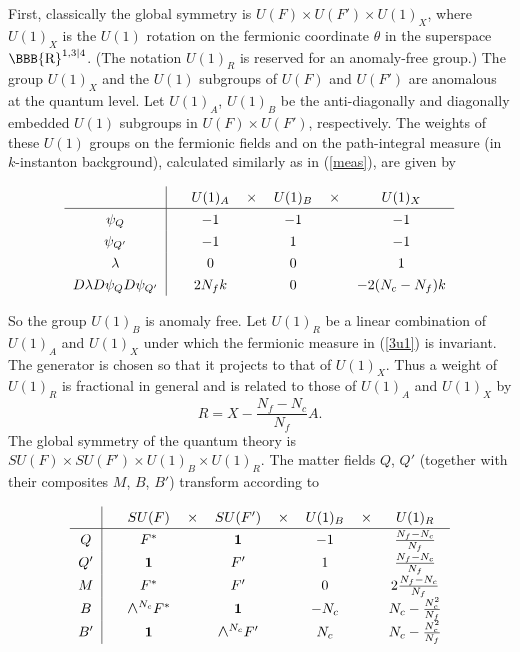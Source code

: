 \documentclass[lecture]{qft-l}
\newcommand{\lam}{\lambda}
\newcommand{\tht}{\theta}
\newcommand{\RE}{{\mbox{\BBB{R}}}}
\newcommand{\medwedge}{\mbox{\fontsize{12pt}{0pt}\selectfont $\wedge$}}
\newcommand{\one}{\mathbf{1}}
\newcommand{\FT}{F'}%
\newcommand{\QT}{Q'}%
\newcommand{\BT}{B'}%
\newcommand{\GLOBAL}{SU(F)\times SU(\FT)\times U(1)_B\times U(1)_R}
\numberwithin{figure}{chapter}
\begin{document}
First, classically the global symmetry is $U(F)\times U(\FT)\times U(1)_X$,
where $U(1)_X$ is the $U(1)$ rotation on the fermionic coordinate $\tht$
in the superspace $\RE^{1,3|4}$.
(The notation $U(1)_R$ is reserved for an anomaly-free group.) 
The group $U(1)_X$ and the $U(1)$ subgroups of $U(F)$ and $U(\FT)$
are anomalous at the quantum level.
Let $U(1)_A$, $U(1)_B$ be the anti-diagonally and diagonally embedded $U(1)$
subgroups in $U(F)\times U(\FT)$, respectively.
The weights of these $U(1)$ groups on the fermionic fields and on the
path-integral measure (in $k$-instanton background),
calculated similarly as in (\ref{meas}), are given by

\bigskip
\begin{equation}
\renewcommand{\arraystretch}{1.3}
\begin{tabular}{c|cccccc}\label{3u1}
	&&    $U(1)_A$	&   $\times$	&   $U(1)_B$	
		&   $\times$	&   $U(1)_X$	\\
			\hline
$\psi_Q$	&&      $-1$	&		&     $-1$	
				&		&    $-1$	\\
$\psi_{\QT}$	&&     $-1$	&		&    $1$	
				&		&    $-1$	\\
$\lam$		&&      $0$	&		&     $0$	
				&		&     $1$	\\
$D\lam D\psi_Q D\psi_{\QT}$ && $2N_fk$ &	&     $0$
&	& $-2(N_c-N_f)k$
        \end{tabular}
\end{equation}

\bigskip\noindent
So the group $U(1)_B$ is anomaly free.
Let $U(1)_R$ be a linear combination of $U(1)_A$ and $U(1)_X$
under which the fermionic measure in (\ref{3u1}) is invariant.
The generator is chosen so that it projects to that of $U(1)_X$.
Thus a weight of $U(1)_R$ is fractional in general and is related to
those of $U(1)_A$ and $U(1)_X$ by
	\begin{equation}\label{RXA}
R=X-\frac{N_f-N_c}{N_f}A.
	\end{equation}
The global symmetry of the quantum theory is $\GLOBAL$.
The matter fields $Q$, $\QT$ (together with their 
composites $M$, $B$, $\BT$) transform according to

\bigskip
\begin{equation}
\renewcommand{\arraystretch}{1.3}
\begin{tabular}{c|cccccccc}\label{trans}
&&    $SU(F)$	&   $\times$	&   $SU(\FT)$	&   $\times$
&    $U(1)_B$	&   $\times$	&   $U(1)_R$	\\
\hline
$Q$	&&     $F^*$	&		&   $\one$	&
&      $-1$	&		&  $\frac{N_f-N_c}{N_f}$  \\
$\QT$	&&     $\one$	&		&    $\FT$	&	
&      $1$	&		&  $\frac{N_f-N_c}{N_f}$  \\
$M$	&&    $F^*$	&		&   $\FT$	&
&      $0$	&		&  $2\frac{N_f-N_c}{N_f}$  \\
$B$	&& $\medwedge^{N_c}F^*$	&	&    $\one$	&
&     $-N_c$	&		&   $N_c-\frac{N_c^2}{N_f}$ \\
$\BT$	&&    $\one$	&	&   $\medwedge^{N_c}\FT$   &
	&     $N_c$	&	&   $N_c-\frac{N_c^2}{N_f}$
\end{tabular}
\end{equation}
\end{document}
